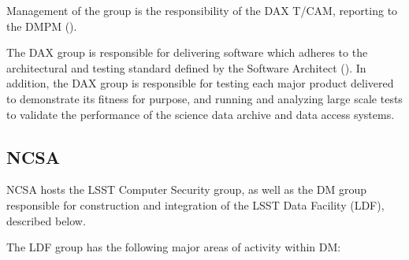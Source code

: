 Management of the group is the responsibility of the \gls{DAX} \gls{T/CAM}, reporting to the \gls{DMPM} ().

The \gls{DAX} group is responsible for delivering software which adheres to the architectural and testing standard
defined by the Software Architect (). In addition, the \gls{DAX} group is responsible for
testing each major product delivered to demonstrate its fitness for purpose, and running and analyzing large
scale tests to validate the performance of the science data archive and data access systems.

\subsection {NCSA\label{sect:ncsa}}


NCSA hosts the \gls{LSST} Computer Security group, as well as the \gls{DM} group responsible for construction and integration of the \gls{LSST} Data Facility (\gls{LDF}), described below.

The \gls{LDF} group has the following major areas of activity within \gls{DM}:

